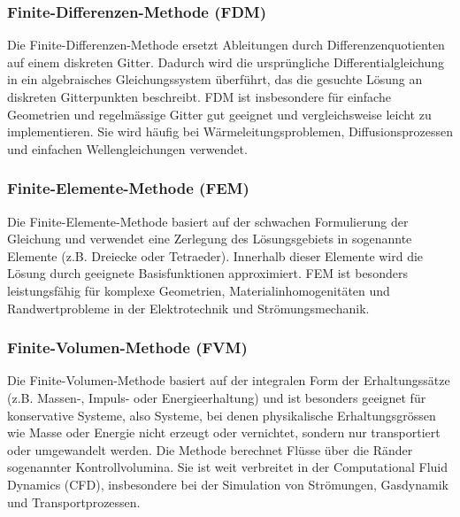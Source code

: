 \subsubsection{Finite-Differenzen-Methode (FDM)}
\label{parallelisierung:section:fdm}
%
%
Die Finite-Differenzen-Methode ersetzt Ableitungen durch Differenzenquotienten auf einem diskreten Gitter.
%
%
Dadurch wird die ursprüngliche Differentialgleichung in ein algebraisches Gleichungssystem überführt, das die gesuchte Lösung an diskreten Gitterpunkten beschreibt.
FDM ist insbesondere für einfache Geometrien und regelmässige Gitter gut geeignet und vergleichsweise leicht zu implementieren.
Sie wird häufig bei Wärmeleitungsproblemen, Diffusionsprozessen und einfachen Wellengleichungen verwendet.
%
%
%

\subsubsection{Finite-Elemente-Methode (FEM)}
%
%
Die Finite-Elemente-Methode basiert auf der schwachen Formulierung der Gleichung und verwendet eine Zerlegung des Lösungsgebiets in sogenannte Elemente (z.B. Dreiecke oder Tetraeder).
%
Innerhalb dieser Elemente wird die Lösung durch geeignete Basisfunktionen approximiert.
%
%
%
FEM ist besonders leistungsfähig für komplexe Geometrien, Materialinhomogenitäten und Randwertprobleme in der Elektrotechnik und Strömungsmechanik.
%
%


\subsubsection{Finite-Volumen-Methode (FVM)}
%
%
Die Finite-Volumen-Methode basiert auf der integralen Form der Erhaltungssätze (z.B. Massen-, Impuls- oder Energieerhaltung) und ist besonders geeignet für konservative Systeme, also Systeme, bei denen physikalische Erhaltungsgrössen wie Masse oder Energie nicht erzeugt oder vernichtet, sondern nur transportiert oder umgewandelt werden.
Die Methode berechnet Flüsse über die Ränder sogenannter Kontrollvolumina.
Sie ist weit verbreitet in der Computational Fluid Dynamics (CFD), insbesondere bei der Simulation von Strömungen, Gasdynamik und Transportprozessen.
%
%
%
%

